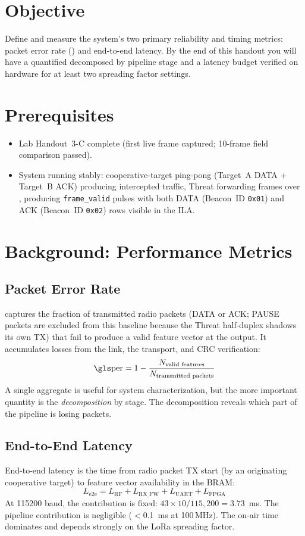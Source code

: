 \documentclass[11pt,letterpaper]{article}
\begin{document}

\section{Objective}
Define and measure the system's two primary reliability and timing metrics: packet error rate (\PER{}) and end-to-end latency. By the end of this handout you will have a quantified \PER{} decomposed by pipeline stage and a latency budget verified on hardware for at least two spreading factor settings.

\section{Prerequisites}
\begin{itemize}[leftmargin=2em]
	\item Lab Handout~3-C complete (first live frame captured; 10-frame field comparison passed).
	\item System running stably: cooperative-target ping-pong (Target~A DATA + Target~B ACK) producing intercepted traffic, Threat forwarding frames over \UART{}, \FPGA{} producing \texttt{frame\_valid} pulses with both DATA (Beacon~ID \texttt{0x01}) and ACK (Beacon~ID \texttt{0x02}) rows visible in the \mbox{ILA{}}.
\end{itemize}

\section{Background: Performance Metrics}

\subsection*{Packet Error Rate}
\PER{} captures the fraction of transmitted radio packets (DATA or ACK; PAUSE packets are excluded from this baseline because the Threat half-duplex shadows its own TX) that fail to produce a valid feature vector at the \FPGA{} output. It accumulates losses from the \RF{} link, the \UART{} transport, and \mbox{CRC} verification:
\[
	\text{\PER{}} = 1 - \frac{N_{\text{valid features}}}{N_{\text{transmitted packets}}}
\]
A single aggregate \PER{} is useful for system characterization, but the more important quantity is the \emph{decomposition} by stage. The decomposition reveals which part of the pipeline is losing packets.

\subsection*{End-to-End Latency}
End-to-end latency is the time from radio packet \mbox{TX} start (by an originating cooperative target) to feature vector availability in the \FPGA{} \mbox{BRAM}:
\[
	L_{\text{e2e}} = L_{\text{RF}} + L_{\text{RX\_FW}} + L_{\text{UART}} + L_{\text{FPGA}}
\]
At 115200 baud, the \UART{} contribution is fixed: $43 \times 10 / 115{,}200 = 3.73$~ms. The \FPGA{} pipeline contribution is negligible ($<$0.1~ms at 100\,MHz). The \RF{} on-air time dominates and depends strongly on the LoRa spreading factor.
\end{document}
